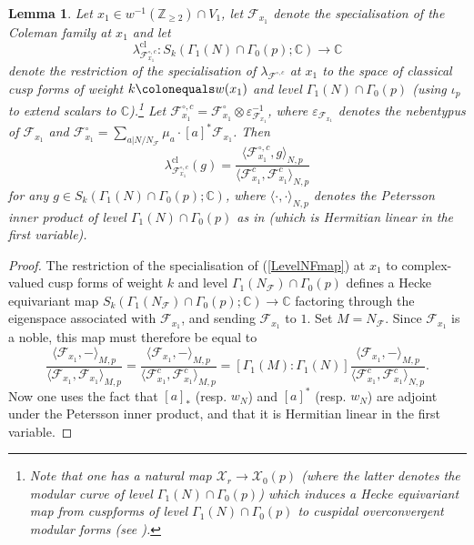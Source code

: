 \documentclass[10pt, oneside]{amsart}
\newcommand{\defeq}{\colonequals}
\numberwithin{equation}{subsection}
\newtheorem{lemma}[equation]{Lemma}
\theoremstyle{definition}
\theoremstyle{remark}
\newcommand{\mbb}[1]{\mathbb{#1}}
\newcommand{\opn}[1]{\operatorname{#1}}
\begin{document}
\begin{lemma} \label{LemmaSpecialisationOfLinearFunctional}
Let $x_1 \in w^{-1}(\mbb{Z}_{\geq 2}) \cap V_1$, let $\mathcal{F}_{x_1}$ denote the specialisation of the Coleman family at $x_1$ and let 
\[
\lambda^{\opn{cl}}_{\mathcal{F}_{x_1}^{\circ, c}} \colon S_k(\Gamma_1(N) \cap \Gamma_0(p); \mbb{C}) \to \mbb{C}
\]
denote the restriction of the specialisation of $\lambda_{\mathcal{F}^{\circ, c}}$ at $x_1$ to the space of classical cusp forms of weight $k \defeq w(x_1)$ and level $\Gamma_1(N) \cap \Gamma_0(p)$ (using $\iota_p$ to extend scalars to $\mbb{C}$).\footnote{Note that one has a natural map $\mathcal{X}_r \to \mathcal{X}_0(p)$ (where the latter denotes the modular curve of level $\Gamma_1(N) \cap \Gamma_0(p)$) which induces a Hecke equivariant map from cuspforms of level $\Gamma_1(N) \cap \Gamma_0(p)$ to cuspidal overconvergent modular forms (see \cite[\S 5.4.4]{BoxerPilloni}).} Let $\mathcal{F}_{x_1}^{\circ, c} = \mathcal{F}^{\circ}_{x_1} \otimes \varepsilon_{\mathcal{F}_{x_1}}^{-1}$, where $\varepsilon_{\mathcal{F}_{x_1}}$ denotes the nebentypus of $\mathcal{F}_{x_1}$ and $\mathcal{F}^{\circ}_{x_1} = \sum_{a | N/N_{\mathcal{F}}} \mu_a \cdot [a]^*\mathcal{F}_{x_1}$. Then
\[
\lambda^{\opn{cl}}_{\mathcal{F}_{x_1}^{\circ, c}}(g) = \frac{\langle \mathcal{F}_{x_1}^{\circ, c}, g \rangle_{N, p}}{\langle \mathcal{F}_{x_1}^{c}, \mathcal{F}_{x_1}^{c} \rangle_{N, p}}
\]
for any $g \in S_k(\Gamma_1(N) \cap \Gamma_0(p); \mbb{C})$, where $\langle \cdot, \cdot \rangle_{N, p}$ denotes the Petersson inner product of level $\Gamma_1(N) \cap \Gamma_0(p)$ as in \cite[Eq. (35)]{DarmonRotgerGrossZagier1} (which is Hermitian linear in the first variable).
\end{lemma}
\begin{proof}
The restriction of the specialisation of (\ref{LevelNFmap}) at $x_1$ to complex-valued cusp forms of weight $k$ and level $\Gamma_1(N_{\mathcal{F}}) \cap \Gamma_0(p)$ defines a Hecke equivariant map $S_k(\Gamma_1(N_{\mathcal{F}}) \cap \Gamma_0(p); \mbb{C}) \to \mbb{C}$ factoring through the eigenspace associated with $\mathcal{F}_{x_1}$, and sending $\mathcal{F}_{x_1}$ to $1$. Set $M = N_{\mathcal{F}}$. Since $\mathcal{F}_{x_1}$ is a noble, this map must therefore be equal to
\[
\frac{\langle \mathcal{F}_{x_1}, - \rangle_{M, p}}{\langle \mathcal{F}_{x_1}, \mathcal{F}_{x_1} \rangle_{M, p}} = \frac{\langle \mathcal{F}_{x_1}, - \rangle_{M, p}}{\langle \mathcal{F}_{x_1}^c, \mathcal{F}_{x_1}^c \rangle_{M, p}} = [\Gamma_1(M) : \Gamma_1(N)] \frac{\langle \mathcal{F}_{x_1}, - \rangle_{M, p}}{\langle \mathcal{F}_{x_1}^c, \mathcal{F}_{x_1}^c \rangle_{N, p}}.
\]
Now one uses the fact that $[a]_*$ (resp. $w_N$) and $[a]^*$ (resp. $w_N$) are adjoint under the Petersson inner product, and that it is Hermitian linear in the first variable.
\end{proof}
\end{document}
